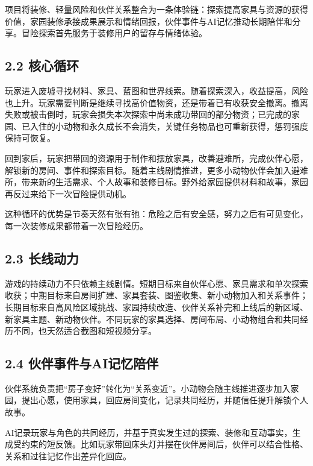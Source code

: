 \documentclass[UTF8,fontset=none,zihao=5,twoside]{ctexart}
\begin{document}
项目将装修、轻量风险和伙伴关系整合为一条体验链：探索提高家具与资源的获得价值，家园装修承接成果展示和情绪回报，伙伴事件与AI记忆推动长期陪伴和分享。冒险探索首先服务于装修用户的留存与情绪体验。

\subsection{2.2 核心循环}\label{22-ux6838ux5fc3ux5faaux73af}

玩家进入废墟寻找材料、家具、蓝图和世界线索。随着探索深入，收益提高，风险也上升。玩家需要判断是继续寻找高价值物资，还是带着已有收获安全撤离。撤离失败或被击倒时，玩家会损失本次探索中尚未成功带回的部分物资；已完成的家园、已入住的小动物和永久成长不会消失，关键任务物品也可重新获得，惩罚强度保持可恢复。

回到家后，玩家把带回的资源用于制作和摆放家具，改善避难所，完成伙伴心愿，解锁新的房间、事件和探索目标。随着主线剧情推进，更多小动物伙伴会加入避难所，带来新的生活需求、个人故事和装修目标。野外给家园提供材料和故事，家园再反过来给下一次冒险提供动机。

这种循环的优势是节奏天然有张有弛：危险之后有安全感，努力之后有可见变化，每一次装修成果都带着一次冒险经历。

\subsection{2.3 长线动力}\label{23-ux957fux7ebfux52a8ux529b}

游戏的持续动力不只依赖主线剧情。短期目标来自伙伴心愿、家具需求和单次探索收获；中期目标来自房间扩建、家具套装、图鉴收集、新小动物加入和关系事件；长期目标来自高风险区域挑战、家园持续改造、伙伴关系补完和上线后的新区域、新家具主题、新动物伙伴。不同玩家的家具选择、房间布局、小动物组合和共同经历不同，也天然适合截图和短视频分享。

\subsection{2.4 伙伴事件与AI记忆陪伴}\label{24-ux4f19ux4f34ux4e8bux4ef6ux4e0eaiux8bb0ux5fc6ux966aux4f34}

伙伴系统负责把``房子变好''转化为``关系变近''。小动物会随主线推进逐步加入家园，提出心愿，使用家具，回应房间变化，记录共同经历，并随信任提升解锁个人故事。

AI记录玩家与角色的共同经历，并基于真实发生过的探索、装修和互动事实，生成受约束的短反馈。比如玩家带回床头灯并摆在伙伴房间后，伙伴可以结合性格、关系和过往记忆作出差异化回应。
\end{document}
